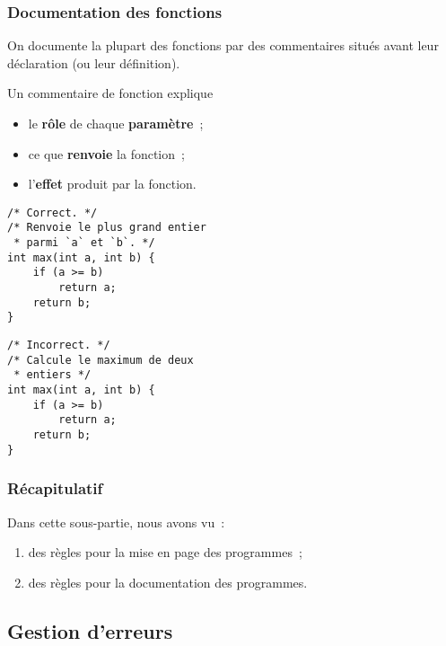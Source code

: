 \begin{frame}[fragile] \frametitle{Documentation des fonctions}
On documente la plupart des \alert{fonctions} par des commentaires 
situés avant leur déclaration (ou leur définition).
\medskip 

Un commentaire de fonction explique

\begin{itemize}
    \item le {\bf rôle} de chaque {\bf paramètre}~;
    \smallskip
    
    \item ce que {\bf renvoie} la fonction~; 
    \smallskip
     
    \item l'{\bf effet} produit par la fonction.
\end{itemize}

\begin{multicols}{2}
\begin{lstlisting}
/* Correct. */
/* Renvoie le plus grand entier 
 * parmi `a` et `b`. */
int max(int a, int b) {
    if (a >= b) 
        return a;
    return b;
}
\end{lstlisting}

\begin{lstlisting}
/* Incorrect. */
/* Calcule le maximum de deux 
 * entiers */
int max(int a, int b) {
    if (a >= b) 
        return a;
    return b;
}
\end{lstlisting}
\end{multicols}
\end{frame}

\begin{frame}[fragile] \frametitle{Récapitulatif}
Dans cette sous-partie, nous avons vu~:

\begin{enumerate}
    \item des règles pour la mise en page des programmes~;
    \smallskip

    \item des règles pour la documentation des programmes.
\end{enumerate}
\end{frame}

\subsection{Gestion d'erreurs}


